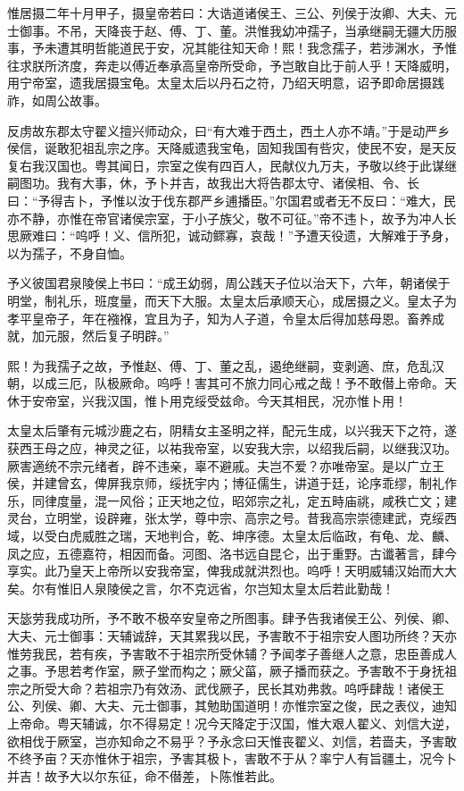 \documentclass[]{article}
\begin{document}
惟居摄二年十月甲子，摄皇帝若曰：大诰道诸侯王、三公、列侯于汝卿、大夫、元士御事。不吊，天降丧于赵、傅、丁、董。洪惟我幼冲孺子，当承继嗣无疆大历服事，予未遭其明哲能道民于安，况其能往知天命！熙！我念孺子，若涉渊水，予惟往求朕所济度，奔走以傅近奉承高皇帝所受命，予岂敢自比于前人乎！天降威明，用宁帝室，遗我居摄宝龟。太皇太后以丹石之符，乃绍天明意，诏予即命居摄践祚，如周公故事。

反虏故东郡太守翟义擅兴师动众，曰``有大难于西土，西土人亦不靖。''于是动严乡侯信，诞敢犯祖乱宗之序。天降威遗我宝龟，固知我国有呰灾，使民不安，是天反复右我汉国也。粤其闻日，宗室之俟有四百人，民献仪九万夫，予敬以终于此谋继嗣图功。我有大事，休，予卜并吉，故我出大将告郡太守、诸侯相、令、长曰：``予得吉卜，予惟以汝于伐东郡严乡逋播臣。''尔国君或者无不反曰：``难大，民亦不静，亦惟在帝官诸侯宗室，于小子族父，敬不可征。''帝不违卜，故予为冲人长思厥难曰：``呜呼！义、信所犯，诚动鳏寡，哀哉！''予遭天役遗，大解难于予身，以为孺子，不身自恤。

予义彼国君泉陵侯上书曰：``成王幼弱，周公践天子位以治天下，六年，朝诸侯于明堂，制礼乐，班度量，而天下大服。太皇太后承顺天心，成居摄之义。皇太子为孝平皇帝子，年在襁褓，宜且为子，知为人子道，令皇太后得加慈母恩。畜养成就，加元服，然后复子明辟。''

熙！为我孺子之故，予惟赵、傅、丁、董之乱，遏绝继嗣，变剥適、庶，危乱汉朝，以成三厄，队极厥命。呜呼！害其可不旅力同心戒之哉！予不敢僣上帝命。天休于安帝室，兴我汉国，惟卜用克绥受兹命。今天其相民，况亦惟卜用！

太皇太后肇有元城沙鹿之右，阴精女主圣明之祥，配元生成，以兴我天下之符，遂获西王母之应，神灵之征，以祐我帝室，以安我大宗，以绍我后嗣，以继我汉功。厥害適统不宗元绪者，辟不违亲，辜不避戚。夫岂不爱？亦唯帝室。是以广立王侯，并建曾玄，俾屏我京师，绥抚宇内；博征儒生，讲道于廷，论序乖缪，制礼作乐，同律度量，混一风俗；正天地之位，昭郊宗之礼，定五畤庙祧，咸秩亡文；建灵台，立明堂，设辟雍，张太学，尊中宗、高宗之号。昔我高宗崇德建武，克绥西域，以受白虎威胜之瑞，天地判合，乾、坤序德。太皇太后临政，有龟、龙、麟、凤之应，五德嘉符，相因而备。河图、洛书远自昆仑，出于重野。古谶著言，肆今享实。此乃皇天上帝所以安我帝室，俾我成就洪烈也。呜呼！天明威辅汉始而大大矣。尔有惟旧人泉陵侯之言，尔不克远省，尔岂知太皇太后若此勤哉！

天毖劳我成功所，予不敢不极卒安皇帝之所图事。肆予告我诸侯王公、列侯、卿、大夫、元士御事：天辅诚辞，天其累我以民，予害敢不于祖宗安人图功所终？天亦惟劳我民，若有疾，予害敢不于祖宗所受休辅？予闻孝子善继人之意，忠臣善成人之事。予思若考作室，厥子堂而构之；厥父菑，厥子播而获之。予害敢不于身抚祖宗之所受大命？若祖宗乃有效汤、武伐厥子，民长其劝弗救。呜呼肆哉！诸侯王公、列侯、卿、大夫、元士御事，其勉助国道明！亦惟宗室之俊，民之表仪，迪知上帝命。粤天辅诚，尔不得易定！况今天降定于汉国，惟大艰人翟义、刘信大逆，欲相伐于厥室，岂亦知命之不易乎？予永念曰天惟丧翟义、刘信，若啬夫，予害敢不终予亩？天亦惟休于祖宗，予害其极卜，害敢不于从？率宁人有旨疆土，况今卜并吉！故予大以尔东征，命不僣差，卜陈惟若此。
\end{document}
